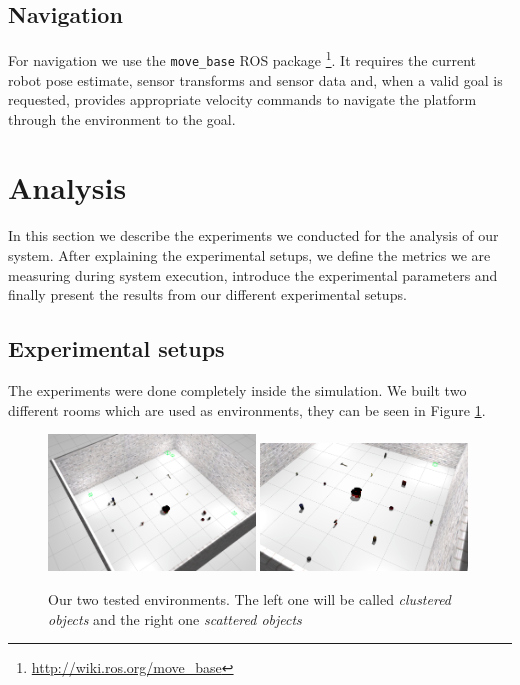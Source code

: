\documentclass[a4paper,11pt,english]{article}
\begin{document}
\subsection{Navigation}
For navigation we use the \texttt{move\_base} ROS package \footnote{\url{http://wiki.ros.org/move_base}}.
It requires the current robot pose estimate, sensor transforms and sensor data and, when a valid goal is requested, provides appropriate velocity commands to navigate the platform through the environment to the goal.

\section{Analysis}
\label{Analysis}
In this section we describe the experiments we conducted for the analysis of our system.
After explaining the experimental setups, we define the metrics we are measuring during system execution, introduce the experimental parameters and finally present the results from our different experimental setups.

\subsection{Experimental setups}
The experiments were done completely inside the simulation.
We built two different rooms which are used as environments, they can be seen in Figure \ref{fig:rooms}.

\begin{figure}[h!]
	\begin{center}
		\includegraphics[width=0.49\textwidth]{src/clustered.png}
		\includegraphics[width=0.49\textwidth]{src/scattered.png}
		\caption{Our two tested environments. The left one will be called \textit{clustered objects} and the right one \textit{scattered objects}}
		\label{fig:rooms}
	\end{center}
\end{figure}
\end{document}
